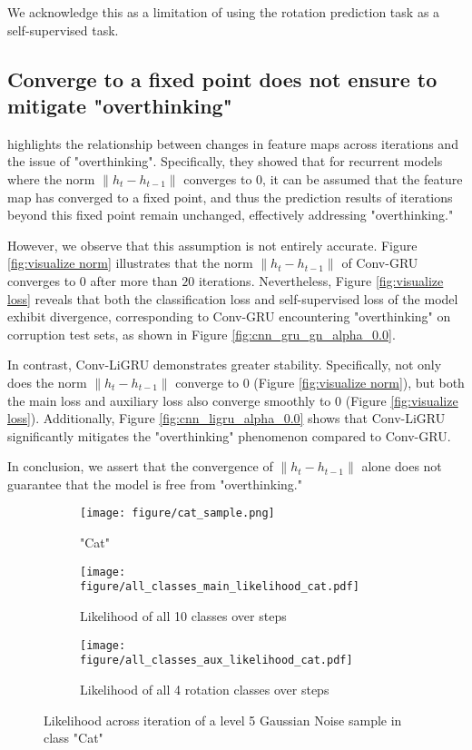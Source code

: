 We acknowledge this as a limitation of using the rotation prediction task as a self-supervised task.

\subsection{Converge to a fixed point does not ensure to mitigate "overthinking"}

\cite{bansal2022endtoend} highlights the relationship between changes in feature maps across iterations and the issue of "overthinking".
Specifically, they showed that for recurrent models where the norm $\|h_t - h_{t-1}\|$ converges to $0$, it can be assumed that the feature map has converged to a fixed point, and thus the prediction results of iterations beyond this fixed point remain unchanged, effectively addressing "overthinking." 

However, we observe that this assumption is not entirely accurate. Figure \ref{fig:visualize norm} illustrates that the norm $\|h_t - h_{t-1}\|$ of Conv-GRU converges to $0$ after more than $20$ iterations. Nevertheless, Figure \ref{fig:visualize loss} reveals that both the classification loss and self-supervised loss of the model exhibit divergence, corresponding to Conv-GRU encountering "overthinking" on corruption test sets, as shown in Figure \ref{fig:cnn_gru_gn_alpha_0.0}. 

In contrast, Conv-LiGRU demonstrates greater stability. Specifically, not only does the norm $\|h_t - h_{t-1}\|$ converge to $0$ (Figure \ref{fig:visualize norm}), but both the main loss and auxiliary loss also converge smoothly to $0$ (Figure \ref{fig:visualize loss}). Additionally, Figure \ref{fig:cnn_ligru_alpha_0.0} shows that Conv-LiGRU significantly mitigates the "overthinking" phenomenon compared to Conv-GRU. 

In conclusion, we assert that the convergence of $\|h_t - h_{t-1}\|$ alone does not guarantee that the model is free from "overthinking."

\begin{figure}[t!]
    \centering
    \begin{subfigure}{0.1\textwidth}
        \texttt{[image: figure/cat\_sample.png]}
        \caption{"Cat"}
        \label{fig:cat_sample}
    \end{subfigure}
    \vfill
    \begin{subfigure}{0.22\textwidth}
        \texttt{[image: figure/all\_classes\_main\_likelihood\_cat.pdf]}
        \caption{Likelihood of all 10 classes over steps}
        \label{fig:all_classes_main_likelihood_hard_cat}
    \end{subfigure}
    \begin{subfigure}{0.22\textwidth}
        \texttt{[image: figure/all\_classes\_aux\_likelihood\_cat.pdf]}
        \caption{Likelihood of all 4 rotation classes over steps}
        \label{fig:all_class_likelihood_aux_hard_cat}
    \end{subfigure}
    \caption{Likelihood across iteration of a level 5 Gaussian Noise sample in class "Cat"}
    \label{fig:likelihood_cat}
\end{figure}

